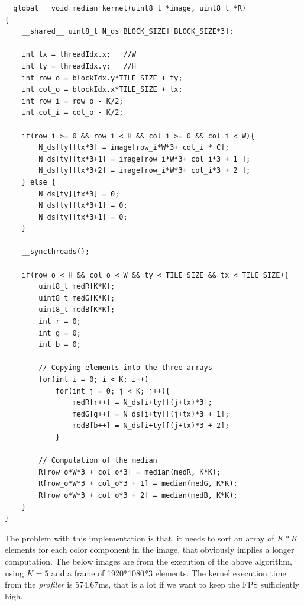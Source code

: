\documentclass[paper=a4, fontsize=10pt]{scrartcl}	%
\begin{document}
		\begin{lstlisting}[style=CStyle]
__global__ void median_kernel(uint8_t *image, uint8_t *R)
{
	__shared__ uint8_t N_ds[BLOCK_SIZE][BLOCK_SIZE*3];
	
	int tx = threadIdx.x;   //W
	int ty = threadIdx.y;   //H
	int row_o = blockIdx.y*TILE_SIZE + ty;
	int col_o = blockIdx.x*TILE_SIZE + tx;
	int row_i = row_o - K/2;
	int col_i = col_o - K/2;
	
	if(row_i >= 0 && row_i < H && col_i >= 0 && col_i < W){
		N_ds[ty][tx*3] = image[row_i*W*3+ col_i * C];
		N_ds[ty][tx*3+1] = image[row_i*W*3+ col_i*3 + 1 ];
		N_ds[ty][tx*3+2] = image[row_i*W*3+ col_i*3 + 2 ];
	} else {
		N_ds[ty][tx*3] = 0;
		N_ds[ty][tx*3+1] = 0;
		N_ds[ty][tx*3+1] = 0;
	}
	
	__syncthreads();
	
	if(row_o < H && col_o < W && ty < TILE_SIZE && tx < TILE_SIZE){
		uint8_t medR[K*K];
		uint8_t medG[K*K];
		uint8_t medB[K*K];
		int r = 0;
		int g = 0;
		int b = 0;
		
		// Copying elements into the three arrays
		for(int i = 0; i < K; i++)
			for(int j = 0; j < K; j++){
				medR[r++] = N_ds[i+ty][(j+tx)*3];
				medG[g++] = N_ds[i+ty][(j+tx)*3 + 1];
				medB[b++] = N_ds[i+ty][(j+tx)*3 + 2];
			}
		
		// Computation of the median
		R[row_o*W*3 + col_o*3] = median(medR, K*K);
		R[row_o*W*3 + col_o*3 + 1] = median(medG, K*K);
		R[row_o*W*3 + col_o*3 + 2] = median(medB, K*K);
	}
}\end{lstlisting}
	
	The problem with this implementation is that, it needs to sort an array of $K*K$ elements for each color component in the image, that obviously implies a longer computation. The below images are from the execution of the above algorithm, using $K=5$ and a frame of 1920*1080*3 elements. The kernel execution time from the \textit{profiler} is 574.67ms, that is a lot if we want to keep the FPS sufficiently high.
	
\end{document}
